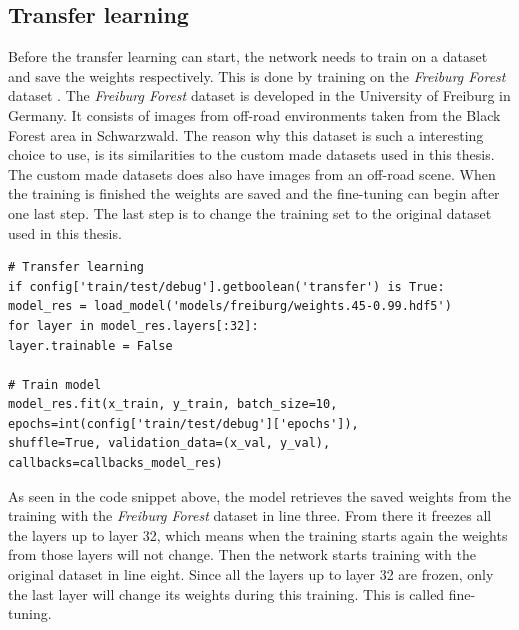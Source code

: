 \documentclass[USenglish]{ifimaster}  %
\begin{document}
\subsection{Transfer learning}
Before the transfer learning can start, the network needs to train on a dataset and save the weights respectively. This is done by training on the \textit{Freiburg Forest} dataset \cite{freiburg_dataset_valada16iser}. The \textit{Freiburg Forest} dataset is developed in the University of Freiburg in Germany. It consists of images from off-road environments taken from the Black Forest area in Schwarzwald. The reason why this dataset is such a interesting choice to use, is its similarities to the custom made datasets used in this thesis. The custom made datasets does also have images from an off-road scene.
\newline
\newline
When the training is finished the weights are saved and the fine-tuning can begin after one last step. The last step is to change the training set to the original dataset used in this thesis.

\begin{verbatim}
# Transfer learning
if config['train/test/debug'].getboolean('transfer') is True:
model_res = load_model('models/freiburg/weights.45-0.99.hdf5')
for layer in model_res.layers[:32]:
layer.trainable = False 

# Train model
model_res.fit(x_train, y_train, batch_size=10,
epochs=int(config['train/test/debug']['epochs']),
shuffle=True, validation_data=(x_val, y_val),
callbacks=callbacks_model_res)
\end{verbatim}

As seen in the code snippet above, the model retrieves the saved weights from the training with the \textit{Freiburg Forest} dataset in line three. From there it freezes all the layers up to layer 32, which means when the training starts again the weights from those layers will not change. Then the network starts training with the original dataset in line eight. Since all the layers up to layer 32 are frozen, only the last layer will change its weights during this training. This is called fine-tuning. 
\end{document}
